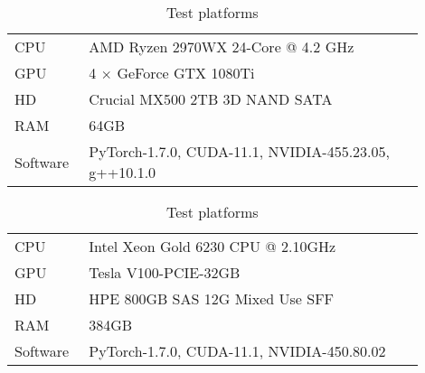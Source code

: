 \begin{table}
  \caption{Test platforms}
  \centering
  \begin{tabular}[t]{p{0.15\linewidth}p{0.75\linewidth}}
    \hline
    CPU      & AMD Ryzen 2970WX 24-Core @ 4.2 GHz                              \\
    GPU      & 4 $\times$ GeForce GTX 1080Ti                                              \\
    HD       & Crucial MX500 2TB 3D NAND SATA                                  \\
    RAM      & 64GB                                                            \\
    Software & PyTorch-1.7.0, CUDA-11.1, NVIDIA-455.23.05, g++10.1.0           \\
    \hline
  \end{tabular}
  \bigskip
  \begin{tabular}[t]{p{0.15\linewidth}p{0.75\linewidth}}
    \hline
    CPU      & Intel Xeon Gold 6230 CPU @ 2.10GHz                              \\
    GPU      & Tesla V100-PCIE-32GB                                            \\
    HD       & HPE 800GB SAS 12G Mixed Use SFF                                 \\
    RAM      & 384GB                                                           \\
    Software & PyTorch-1.7.0, CUDA-11.1, NVIDIA-450.80.02                      \\
    \hline
  \end{tabular}
  \label{tab:platforms}
\end{table}